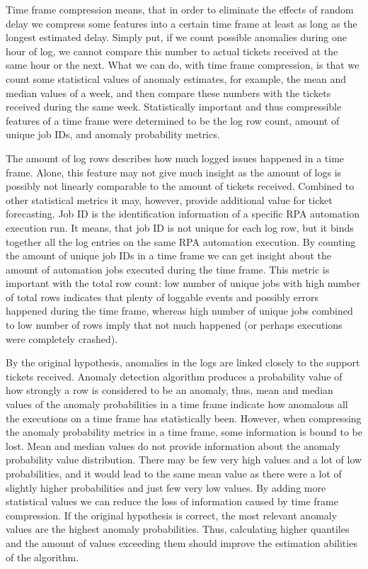 Time frame compression means,
that in order to eliminate the effects of random delay
we compress some features into a certain time frame
at least as long as the longest estimated delay.
Simply put,
if we count possible anomalies during one hour of log,
we cannot compare this number to actual tickets received
at the same hour or the next.
What we can do,
with time frame compression,
is that we count some statistical values of anomaly estimates,
for example, the mean and median values of a week,
and then compare these numbers with the tickets received
during the same week.
Statistically important and thus compressible features of a time frame
were determined to be the log row count,
amount of unique job IDs, and anomaly probability metrics.

The amount of log rows describes
how much logged issues happened in a time frame.
Alone,
this feature may not give much insight
as the amount of logs is possibly not linearly comparable
to the amount of tickets received.
Combined to other statistical metrics
it may, however,
provide additional value for ticket forecasting.
Job ID is the identification information of a specific RPA automation execution run.
It means,
that job ID is not unique for each log row,
but it binds together all the log entries on the same RPA automation execution.
By counting the amount of unique job IDs in a time frame
we can get insight about the amount of automation jobs executed during the time frame.
This metric is important with the total row count:
low number of unique jobs with high number of total rows
indicates that plenty of loggable events and possibly errors happened during the time frame,
whereas high number of unique jobs combined to low number of rows
imply that not much happened (or perhaps executions were completely crashed).

By the original hypothesis,
anomalies in the logs are linked closely to the support tickets received.
Anomaly detection algorithm produces a probability value of
how strongly a row is considered to be an anomaly,
thus,
mean and median values of the anomaly probabilities in a time frame
indicate how anomalous all the executions on a time frame has statistically been.
However,
when compressing the anomaly probability metrics in a time frame,
some information is bound to be lost.
Mean and median values do not provide information
about the anomaly probability value distribution.
There may be few very high values and a lot of low probabilities,
and it would lead to the same mean value
as there were a lot of slightly higher probabilities and just few very low values.
By adding more statistical values
we can reduce the loss of information caused by time frame compression.
If the original hypothesis is correct,
the most relevant anomaly values are the highest anomaly probabilities.
Thus,
calculating higher quantiles and the amount of values exceeding them
should improve the estimation abilities of the algorithm.

